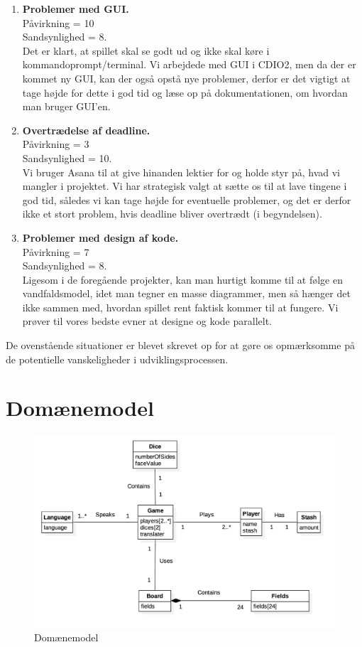 \begin{enumerate}
    \item \textbf{Problemer med GUI.} \\
    Påvirkning = 10\\ Sandsynlighed = 8.\\
    Det er klart, at spillet skal se godt ud og ikke skal køre i kommandoprompt/terminal.
    Vi arbejdede med GUI i CDIO2, men da der er kommet ny GUI, kan der også opstå nye problemer, derfor er det vigtigt at tage højde for dette i god tid og læse op på dokumentationen, om hvordan man bruger GUI'en.
    \item \textbf{Overtrædelse af deadline.} \\
    Påvirkning = 3\\ Sandsynlighed = 10.\\
    Vi bruger Asana til at give hinanden lektier for og holde styr på, hvad vi mangler i projektet.
    Vi har strategisk valgt at sætte os til at lave tingene i god tid, således vi kan tage højde for eventuelle problemer, og det er derfor ikke et stort problem, hvis deadline bliver overtrædt (i begyndelsen).
    \item \textbf{Problemer med design af kode.} \\
    Påvirkning = 7\\ Sandsynlighed = 8.\\
    Ligesom i de foregående projekter, kan man hurtigt komme til at følge en vandfaldsmodel, idet man tegner en masse diagrammer, men så hænger det ikke sammen med, hvordan spillet rent faktisk kommer til at fungere.
    Vi prøver til vores bedste evner at designe og kode parallelt.
    
\end{enumerate}

De ovenstående situationer er blevet skrevet op for at gøre os opmærksomme på de potentielle vanskeligheder i udviklingsprocessen.

\section{Domænemodel}

\begin{figure}[H]
    \begin{center}
        \includegraphics[width=\columnwidth]{graphics/domain/Domainmodel.png}
        \caption{Domænemodel}
        \label{fig:use_case_diagram}
    \end{center}
\end{figure}